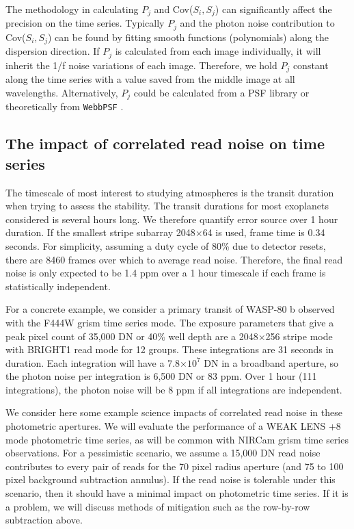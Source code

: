 \documentclass{aastex62}
\begin{document}
The methodology in calculating $P_j$ and Cov($S_i,S_j$) can significantly affect the precision on the time series.
Typically $P_j$ and the photon noise contribution to Cov($S_i,S_j$) can be found by fitting smooth functions (polynomials) along the dispersion direction.
If $P_j$ is calculated from each image individually, it will inherit the 1/f noise variations of each image.
Therefore, we hold $P_j$ constant along the time series with a value saved from the middle image at all wavelengths.
Alternatively, $P_j$ could be calculated from a PSF library or theoretically from \texttt{WebbPSF} \citep{perrin2014webbpsf}.

\subsection{The impact of correlated read noise on time series}

The timescale of most interest to studying atmospheres is the transit duration when trying to assess the stability.
The transit durations for most exoplanets considered is several hours long.
We therefore quantify error source over 1 hour duration.
If the smallest stripe subarray 2048$\times$64 is used, frame time is 0.34 seconds.
For simplicity, assuming a duty cycle of 80\% due to detector resets, there are 8460 frames over which to average read noise.
Therefore, the final read noise is only expected to be 1.4 ppm over a 1 hour timescale if each frame is statistically independent.

For a concrete example, we consider a primary transit of WASP-80 b observed with the F444W grism time series mode.
The exposure parameters that give a peak pixel count of 35,000 DN or 40\% well depth are a 2048$\times$256 stripe mode with BRIGHT1 read mode for 12 groups.
These integrations are 31 seconds in duration.
Each integration will have a 7.8$\times 10^7$ DN in a broadband aperture, so the photon noise per integration is 6,500 DN or 83 ppm.
Over 1 hour (111 integrations), the photon noise will be 8 ppm if all integrations are independent.


We consider here some example science impacts of correlated read noise in these photometric apertures.
We will evaluate the performance of a WEAK LENS +8 mode photometric time series, as will be common with NIRCam grism time series observations.
For a pessimistic scenario, we assume a 15,000 DN read noise contributes to every pair of reads for the 70 pixel radius aperture (and 75 to 100 pixel background subtraction annulus).
If the read noise is tolerable under this scenario, then it should have a minimal impact on photometric time series.
If it is a problem, we will discuss methods of mitigation such as the row-by-row subtraction above.
\end{document}
